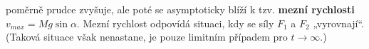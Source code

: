 \begin{mdframed}[style=mdexam]
\begin{example}
    {\centering
    \captionsetup{type=figure}
    \label{mai:fig058}
    \par}

    poměrně prudce zvyšuje, ale poté se asymptoticky blíží k tzv. \textbf{mezní rychlosti} \(v_{max}
    = Mg\sin\alpha\). Mezní rychlost odpovídá situaci, kdy se síly \(F_1\) a \(F_2\) „vyrovnají“.
    (Taková situace však nenastane, je pouze limitním případem pro \(t \rightarrow \infty\).) 
  \end{example}
\end{mdframed}